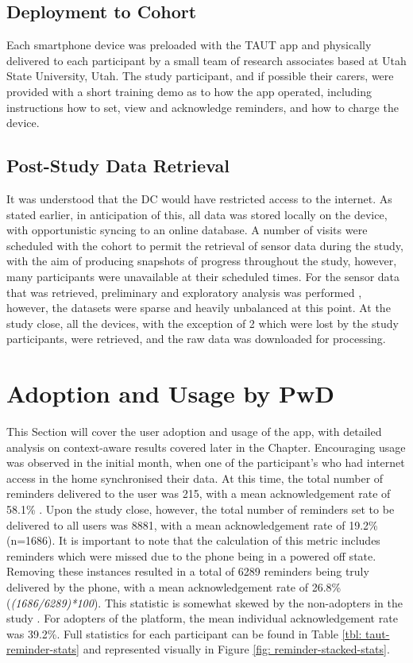 \subsection{Deployment to Cohort}
Each smartphone device was preloaded with the TAUT app and physically delivered to each participant by a small team of research associates based at Utah State University, Utah. The study participant, and if possible their carers, were provided with a short training demo as to how the app operated, including instructions how to set, view and acknowledge reminders, and how to charge the device.

\subsection{Post-Study Data Retrieval}
It was understood that the DC would have restricted access to the internet. As stated earlier, in anticipation of this, all data was stored locally on the device, with opportunistic syncing to an online database. A number of visits were scheduled with the cohort to permit the retrieval of sensor data during the study, with the aim of producing snapshots of progress throughout the study, however, many participants were unavailable at their scheduled times. For the sensor data that was retrieved, preliminary and exploratory analysis was performed \cite{Hartin2014-WAGER}, however, the datasets were sparse and heavily unbalanced at this point.
At the study close, all the devices, with the exception of 2 which were lost by the study participants, were retrieved, and the raw data was downloaded for processing.

\section{Adoption and Usage by PwD}
This Section will cover the user adoption and usage of the app, with detailed analysis on context-aware results covered later in the Chapter.
Encouraging usage was observed in the initial month, when one of the participant's who had internet access in the home synchronised their data. At this time, the total number of reminders delivered to the user was 215, with a mean acknowledgement rate of 58.1\% \cite{Hartin2014-EMBC}. Upon the study close, however, the total number of reminders set to be delivered to all users was 8881, with a mean acknowledgement rate of 19.2\% (n=1686). It is important to note that the calculation of this metric includes reminders which were missed due to the phone being in a powered off state. Removing these instances resulted in a total of 6289 reminders being truly delivered by the phone, with a mean acknowledgement rate of 26.8\% (\textit{(1686/6289)*100}). This statistic is somewhat skewed by the non-adopters in the study \cite{Cleland2014-IWAAL}. For adopters of the platform, the mean individual acknowledgement rate was 39.2\%. Full statistics for each participant can be found in Table \ref{tbl: taut-reminder-stats} and represented visually in Figure \ref{fig: reminder-stacked-stats}.

